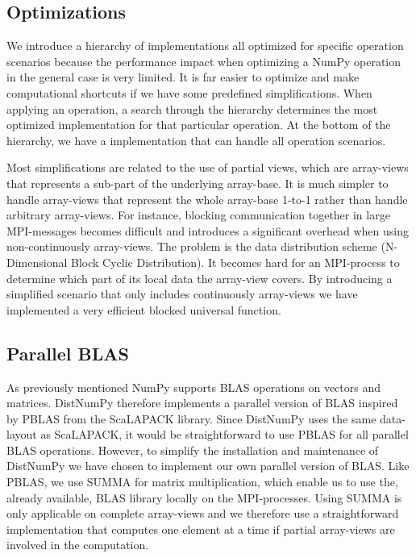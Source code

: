 \documentclass[10pt]{article}
\begin{document}
\subsection{Optimizations}
We introduce a hierarchy of implementations all optimized for specific operation scenarios because the performance impact when optimizing a NumPy operation in the general case is very limited. It is far easier to optimize and make computational shortcuts if we have some predefined simplifications. When applying an operation, a search through the hierarchy determines the most optimized implementation for that particular operation. At the bottom of the hierarchy, we have a implementation that can handle all operation scenarios.

Most simplifications are related to the use of partial views, which are array-views that represents a sub-part of the underlying array-base. It is much simpler to handle array-views that represent the whole array-base 1-to-1 rather than handle arbitrary array-views. For instance, blocking communication together in large MPI-messages becomes difficult and introduces a significant overhead when using non-continuously array-views. The problem is the data distribution scheme (N-Dimensional Block Cyclic Distribution). It becomes hard for an MPI-process to determine which part of its local data the array-view covers. By introducing a simplified scenario that only includes continuously array-views we have implemented a very efficient blocked universal function.


\subsection{Parallel BLAS}
As previously mentioned NumPy supports BLAS operations on vectors and matrices. DistNumPy therefore implements a parallel version of BLAS inspired by PBLAS from the ScaLAPACK library. Since DistNumPy uses the same data-layout as ScaLAPACK, it would be straightforward to use PBLAS for all parallel BLAS operations. However, to simplify the installation and maintenance of DistNumPy we have chosen to implement our own parallel version of BLAS. Like PBLAS, we use SUMMA\cite{SUMMA_GeijnW97} for matrix multiplication, which enable us to use the, already available, BLAS library locally on the MPI-processes. Using SUMMA is only applicable on complete array-views and we therefore use a straightforward implementation that computes one element at a time if partial array-views are involved in the computation. 
\end{document}
